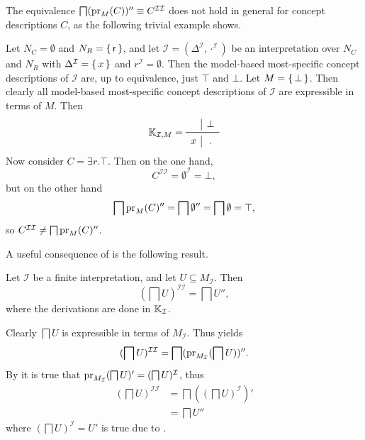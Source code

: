 The equivalence $\bigsqcap (\operatorname{pr}_M(C))'' \equiv C^{\mathcal{I}\mathcal{I}}$ does not hold
in general for concept descriptions $C$, as the following trivial example shows.

\begin{Example}
  \label{expl:counterexample}
  Let $N_C = \emptyset$ and $N_R = {\{\, \mathsf{r} \,\}}$, and let $\mathcal{I} =
  (\Delta^{\mathcal{I}}, \cdot^{\mathcal{I}})$ be an interpretation over $N_C$ and $N_R$
  with $\Delta^{\mathcal{I}} = {\{\, x \,\}}$ and $r^{\mathcal{I}} = \emptyset$.  Then the
  model-based most-specific concept descriptions of $\mathcal{I}$ are, up to equivalence,
  just $\top$ and $\bot$.  Let $M = {\{\, \bot \,\}}$.  Then clearly all model-based
  most-specific concept descriptions of $\mathcal{I}$ are expressible in terms of $M$.
  Then
  \begin{equation*}
    \con K_{\mathcal{I}, M} =
    \begin{array}{c|c}
      ~ & \bot \\\midrule
      x & . \\
    \end{array}
  \end{equation*}
  Now consider $C = \exists r. \top$.  Then on the one hand,
  \begin{equation*}
    C^{\mathcal{I}\mathcal{I}} = \emptyset^{\mathcal{I}} = \bot,
  \end{equation*}
  but on the other hand
  \begin{equation*}
    \bigsqcap \operatorname{pr}_M(C)'' = \bigsqcap \emptyset'' = \bigsqcap \emptyset = \top,
  \end{equation*}
  so $C^{\mathcal{I}\mathcal{I}} \neq \bigsqcap \operatorname{pr}_M(C)''$.
\end{Example}

A useful consequence of  is the following result.

\begin{Lemma}
  \label{lem:double-II-gets-double-prime}
  Let $\mathcal{I}$ be a finite interpretation, and let $U \subseteq M_{\mathcal{I}}$.  Then
  \begin{equation*}
    (\bigsqcap U)^{\mathcal{I}\mathcal{I}} = \bigsqcap U'',
  \end{equation*}
  where the derivations are done in ${\mathbb{K}}_{\mathcal{I}}$.
\end{Lemma}
\begin{Proof}
  Clearly $\bigsqcap U$ is expressible in terms of $M_{\mathcal{I}}$.  Thus
   yields
  \begin{equation*}
    (\bigsqcap U)^{\mathcal{I}\mathcal{I}} = \bigsqcap(\operatorname{pr}_{M_{\mathcal{I}}}(\bigsqcap U))''.
  \end{equation*}
  By  it is true that $\operatorname{pr}_{M_{\mathcal{I}}}(\bigsqcap U)'
  = (\bigsqcap U)^{\mathcal{I}}$, thus
  \begin{align*}
    (\bigsqcap U)^{\mathcal{I}\mathcal{I}}
    &= \bigsqcap ((\bigsqcap U)^{\mathcal{I}})'\\
    &= \bigsqcap U''
  \end{align*}
  where $(\bigsqcap U)^{\mathcal{I}} = U'$ is true due to
  .
\end{Proof}



